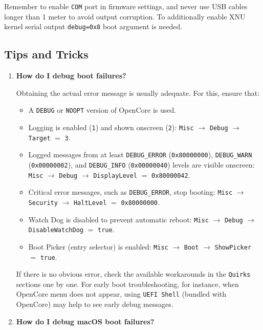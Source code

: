 \documentclass[]{article}
\providecommand{\tightlist}{%
  \setlength{\itemsep}{0pt}\setlength{\parskip}{0pt}}
\begin{document}
Remember to enable \texttt{COM} port in firmware settings, and never use USB cables longer
than 1 meter to avoid output corruption. To additionally enable XNU kernel serial output
\texttt{debug=0x8} boot argument is needed.

\subsection{Tips and Tricks}\label{troubleshootingtricks}

\begin{enumerate}
\item
  \textbf{How do I debug boot failures?}

  Obtaining the actual error message is usually adequate. For this, ensure that:
  \begin{itemize}
  \tightlist
  \item A \texttt{DEBUG} or \texttt{NOOPT} version of OpenCore is used.
  \item Logging is enabled (\texttt{1}) and shown onscreen (\texttt{2}):
  \texttt{Misc} $\rightarrow$ \texttt{Debug} $\rightarrow$ \texttt{Target}
  $=$ \texttt{3}.
  \item Logged messages from at least \texttt{DEBUG\_ERROR}
  (\texttt{0x80000000}), \texttt{DEBUG\_WARN} (\texttt{0x00000002}), and
  \texttt{DEBUG\_INFO} (\texttt{0x00000040}) levels are visible onscreen:
  \texttt{Misc} $\rightarrow$ \texttt{Debug} $\rightarrow$ \texttt{DisplayLevel}
  $=$ \texttt{0x80000042}.
  \item Critical error messages, such as \texttt{DEBUG\_ERROR}, stop booting:
  \texttt{Misc} $\rightarrow$ \texttt{Security}
  $\rightarrow$ \texttt{HaltLevel} $=$ \texttt{0x80000000}.
  \item Watch Dog is disabled to prevent automatic reboot:
  \texttt{Misc} $\rightarrow$ \texttt{Debug} $\rightarrow$
  \texttt{DisableWatchDog} $=$ \texttt{true}.
  \item Boot Picker (entry selector) is enabled: \texttt{Misc}
  $\rightarrow$ \texttt{Boot} $\rightarrow$ \texttt{ShowPicker} $=$ \texttt{true}.
  \end{itemize}

  If there is no obvious error, check the available workarounds in the \texttt{Quirks} sections
  one by one. For early boot troubleshooting, for instance, when OpenCore menu does not appear,
  using \texttt{UEFI Shell} (bundled with OpenCore) may help to see
  early debug messages.

\item
  \textbf{How do I debug macOS boot failures?}


\end{enumerate}
\end{document}
